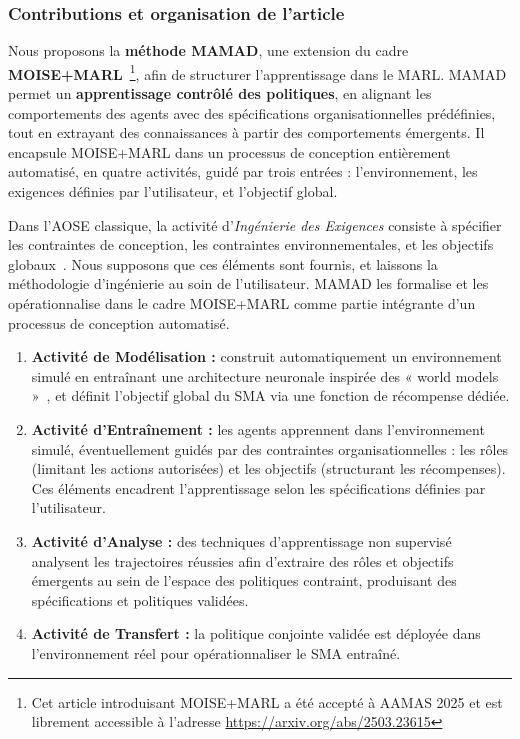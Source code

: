 \subsubsection{Contributions et organisation de l'article}

Nous proposons la \textbf{méthode MAMAD}, une extension du cadre \textbf{MOISE+MARL}~\cite{soule2025moisemarl}\footnote{Cet article introduisant MOISE+MARL a été accepté à AAMAS 2025 et est librement accessible à l'adresse \url{https://arxiv.org/abs/2503.23615}}, afin de structurer l'apprentissage dans le MARL. MAMAD permet un \textbf{apprentissage contrôlé des politiques}, en alignant les comportements des agents avec des spécifications organisationnelles prédéfinies, tout en extrayant des connaissances à partir des comportements émergents. Il encapsule MOISE+MARL dans un processus de conception entièrement automatisé, en quatre activités, guidé par trois entrées : l'environnement, les exigences définies par l'utilisateur, et l'objectif global.

Dans l'AOSE classique, la activité d'\textit{Ingénierie des Exigences} consiste à spécifier les contraintes de conception, les contraintes environnementales, et les objectifs globaux~\cite{Pavon2003, Bernon2005}. Nous supposons que ces éléments sont fournis, et laissons la méthodologie d'ingénierie au soin de l'utilisateur. MAMAD les formalise et les opérationnalise dans le cadre MOISE+MARL comme partie intégrante d'un processus de conception automatisé.

\begin{enumerate}
    \item \textbf{Activité de Modélisation :} construit automatiquement un environnement simulé en entraînant une architecture neuronale inspirée des « world models »~\cite{Ha2018}, et définit l'objectif global du SMA via une fonction de récompense dédiée.
    \item \textbf{Activité d'Entraînement :} les agents apprennent dans l'environnement simulé, éventuellement guidés par des contraintes organisationnelles : les rôles (limitant les actions autorisées) et les objectifs (structurant les récompenses). Ces éléments encadrent l'apprentissage selon les spécifications définies par l'utilisateur.
    \item \textbf{Activité d'Analyse :} des techniques d'apprentissage non supervisé analysent les trajectoires réussies afin d'extraire des rôles et objectifs émergents au sein de l'espace des politiques contraint, produisant des spécifications et politiques validées.
    \item \textbf{Activité de Transfert :} la politique conjointe validée est déployée dans l'environnement réel pour opérationnaliser le SMA entraîné.
\end{enumerate}

